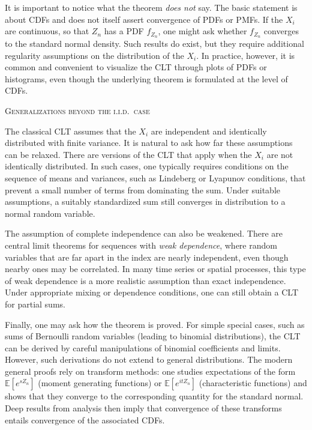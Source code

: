 It is important to notice what the theorem \textit{does not} say.  
The basic statement is about CDFs and does not itself assert convergence of PDFs or PMFs.  
If the \(X_i\) are continuous, so that \(Z_n\) has a PDF \(f_{Z_n}\), one might ask whether \(f_{Z_n}\) converges to the standard normal density.  
Such results do exist, but they require additional regularity assumptions on the distribution of the \(X_i\).  
In practice, however, it is common and convenient to visualize the CLT through plots of PDFs or histograms, even though the underlying theorem is formulated at the level of CDFs.

\bigskip
\textsc{Generalizations beyond the i.i.d.\ case}

The classical CLT assumes that the \(X_i\) are independent and identically distributed with finite variance.  
It is natural to ask how far these assumptions can be relaxed.  
There are versions of the CLT that apply when the \(X_i\) are not identically distributed.  
In such cases, one typically requires conditions on the sequence of means and variances, such as Lindeberg or Lyapunov conditions, that prevent a small number of terms from dominating the sum.  
Under suitable assumptions, a suitably standardized sum still converges in distribution to a normal random variable.

The assumption of complete independence can also be weakened.  
There are central limit theorems for sequences with \textit{weak dependence}, where random variables that are far apart in the index are nearly independent, even though nearby ones may be correlated.  
In many time series or spatial processes, this type of weak dependence is a more realistic assumption than exact independence.  
Under appropriate mixing or dependence conditions, one can still obtain a CLT for partial sums.

Finally, one may ask how the theorem is proved.  
For simple special cases, such as sums of Bernoulli random variables (leading to binomial distributions), the CLT can be derived by careful manipulations of binomial coefficients and limits.  
However, such derivations do not extend to general distributions.  
The modern general proofs rely on transform methods: one studies expectations of the form \(\mathbb{E}[e^{s Z_n}]\) (moment generating functions) or \(\mathbb{E}[e^{it Z_n}]\) (characteristic functions) and shows that they converge to the corresponding quantity for the standard normal.  
Deep results from analysis then imply that convergence of these transforms entails convergence of the associated CDFs.

